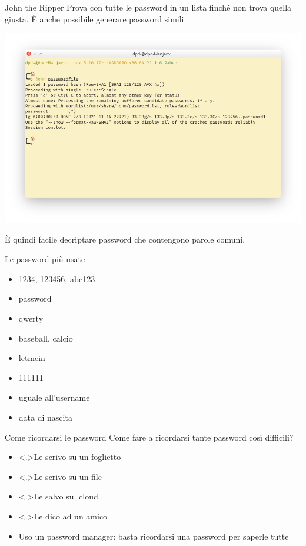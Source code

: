 \begin{myframe}{John the Ripper}
  Prova con tutte le password in un lista finché non trova quella giusta. È anche possibile generare password simili.

  \pause
  \vspace*{-12pt}
  \includegraphics[width=.8\textwidth]{img/john}
  \vspace*{-19pt}

  \pause
  È quindi facile decriptare password che contengono parole comuni.
\end{myframe}

\begin{myframe}{Le password più usate}
  \pause
  \begin{itemize}[<+->]
    \item 1234, 123456, abc123
    \item password
    \item qwerty
    \item baseball, calcio
    \item letmein
    \item 111111
    \item uguale all'username
    \item data di nascita
  \end{itemize}


\end{myframe}

\begin{myframe}{Come ricordarsi le password}
  Come fare a ricordarsi tante password così difficili?
  \pause
  \begin{itemize}[<+->]
    \item \stafter<.>{Le scrivo su un foglietto}
    \item \stafter<.>{Le scrivo su un file}
    \item \stafter<.>{Le salvo sul cloud}
    \item \stafter<.>{Le dico ad un amico}
    \item Uso un password manager: basta ricordarsi una password per saperle tutte
  \end{itemize}
\end{myframe}

